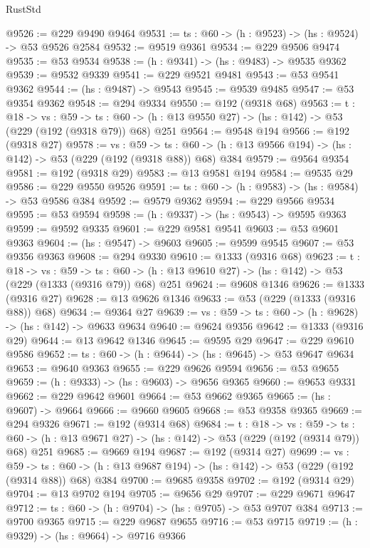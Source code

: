 \begin{lexlean}{RustStd}
\begin{coremodule}
@9526 := @229 @9490 @9464
@9531 := {ts : @60} -> (h : @9523) -> (hs : @9524) -> @53 @9526 @2584
@9532 := @9519 @9361
@9534 := @229 @9506 @9474
@9535 := @53 @9534
@9538 := (h : @9341) -> (hs : @9483) -> @9535 @9362
@9539 := @9532 @9339
@9541 := @229 @9521 @9481
@9543 := @53 @9541 @9362
@9544 := (hs : @9487) -> @9543
@9545 := @9539 @9485
@9547 := @53 @9354 @9362
@9548 := @294 @9334
@9550 := @192 (@9318 @68)
@9563 := {t : @18} ->
  {vs : @59} ->
  {ts : @60} -> (h : @13 @9550 @27) -> (hs : @142) -> @53 (@229 (@192 (@9318 @79)) @68) @251
@9564 := @9548 @194
@9566 := @192 (@9318 @27)
@9578 := {vs : @59} ->
  {ts : @60} -> (h : @13 @9566 @194) -> (hs : @142) -> @53 (@229 (@192 (@9318 @88)) @68) @384
@9579 := @9564 @9354
@9581 := @192 (@9318 @29)
@9583 := @13 @9581 @194
@9584 := @9535 @29
@9586 := @229 @9550 @9526
@9591 := {ts : @60} -> (h : @9583) -> (hs : @9584) -> @53 @9586 @384
@9592 := @9579 @9362
@9594 := @229 @9566 @9534
@9595 := @53 @9594
@9598 := (h : @9337) -> (hs : @9543) -> @9595 @9363
@9599 := @9592 @9335
@9601 := @229 @9581 @9541
@9603 := @53 @9601 @9363
@9604 := (hs : @9547) -> @9603
@9605 := @9599 @9545
@9607 := @53 @9356 @9363
@9608 := @294 @9330
@9610 := @1333 (@9316 @68)
@9623 := {t : @18} ->
  {vs : @59} ->
  {ts : @60} -> (h : @13 @9610 @27) -> (hs : @142) -> @53 (@229 (@1333 (@9316 @79)) @68) @251
@9624 := @9608 @1346
@9626 := @1333 (@9316 @27)
@9628 := @13 @9626 @1346
@9633 := @53 (@229 (@1333 (@9316 @88)) @68)
@9634 := @9364 @27
@9639 := {vs : @59} -> {ts : @60} -> (h : @9628) -> (hs : @142) -> @9633 @9634
@9640 := @9624 @9356
@9642 := @1333 (@9316 @29)
@9644 := @13 @9642 @1346
@9645 := @9595 @29
@9647 := @229 @9610 @9586
@9652 := {ts : @60} -> (h : @9644) -> (hs : @9645) -> @53 @9647 @9634
@9653 := @9640 @9363
@9655 := @229 @9626 @9594
@9656 := @53 @9655
@9659 := (h : @9333) -> (hs : @9603) -> @9656 @9365
@9660 := @9653 @9331
@9662 := @229 @9642 @9601
@9664 := @53 @9662 @9365
@9665 := (hs : @9607) -> @9664
@9666 := @9660 @9605
@9668 := @53 @9358 @9365
@9669 := @294 @9326
@9671 := @192 (@9314 @68)
@9684 := {t : @18} ->
  {vs : @59} ->
  {ts : @60} -> (h : @13 @9671 @27) -> (hs : @142) -> @53 (@229 (@192 (@9314 @79)) @68) @251
@9685 := @9669 @194
@9687 := @192 (@9314 @27)
@9699 := {vs : @59} ->
  {ts : @60} -> (h : @13 @9687 @194) -> (hs : @142) -> @53 (@229 (@192 (@9314 @88)) @68) @384
@9700 := @9685 @9358
@9702 := @192 (@9314 @29)
@9704 := @13 @9702 @194
@9705 := @9656 @29
@9707 := @229 @9671 @9647
@9712 := {ts : @60} -> (h : @9704) -> (hs : @9705) -> @53 @9707 @384
@9713 := @9700 @9365
@9715 := @229 @9687 @9655
@9716 := @53 @9715
@9719 := (h : @9329) -> (hs : @9664) -> @9716 @9366

\end{coremodule}
\end{lexlean}

